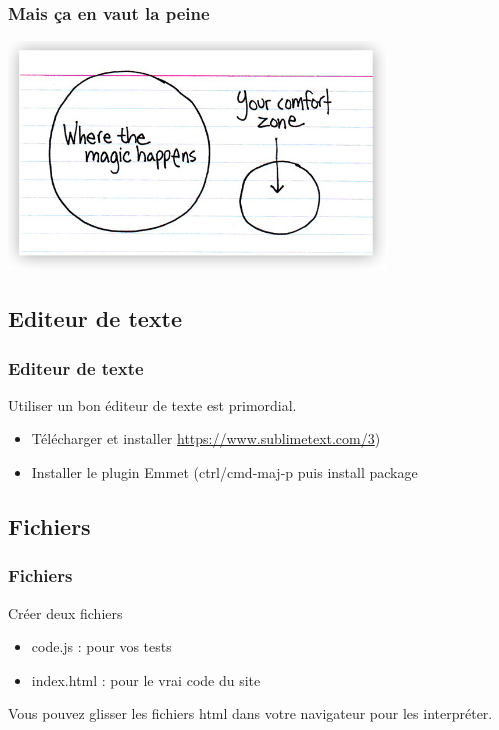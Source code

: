 \documentclass{beamer}
\begin{document}
    \begin{frame}
		\frametitle{Mais ça en vaut la peine}
		\centering \includegraphics[width=10cm]{images/wherethemagichappens.jpg} 
    \end{frame}

    \subsection{Editeur de texte}
    \begin{frame}
		\frametitle{Editeur de texte}

    	Utiliser un bon éditeur de texte est primordial.
        \begin{itemize}
			\item{Télécharger et installer \url{https://www.sublimetext.com/3})}
			\item{Installer le plugin Emmet (ctrl/cmd-maj-p puis install package}	
        \end{itemize}
		
    \end{frame}

    \subsection{Fichiers}
    \begin{frame}
		\frametitle{Fichiers}

        Créer deux fichiers
        \begin{itemize}
          \item code.js : pour vos tests
          \item index.html : pour le vrai code du site
        \end{itemize}
        
        \vspace{1cm}
        \centering Vous pouvez glisser les fichiers html dans votre navigateur pour les interpréter.
    \end{frame}
\end{document}
